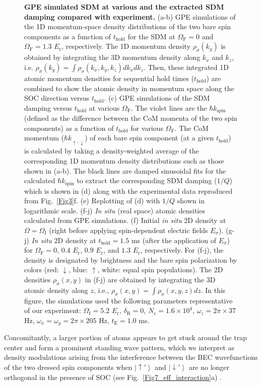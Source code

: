 \documentclass[showpacs,preprintnumbers,amsmath,amssymb, superscriptaddress, aps, reprint]{revtex4-1}
\def\E_r{E_{\text{r}}}
\def\deltaR{\delta_{\text{R}}}
\def\OmegaF{\Omega_{\text{F}}}
\def\OmegaI{\Omega_{\text{I}}}
\def\thold{t_{\text{hold}}}
\begin{document}
{\begin{figure}[ht]
\caption{{\textbf{GPE simulated SDM at various {\boldmath{$\OmegaF$}} and the extracted SDM damping compared with experiment.}} (a-b) GPE simulations of the 1D momentum-space density distributions of the two bare spin components as a function of $\thold$ for the SDM at $\OmegaF = 0$ and $\OmegaF = 1.3$ $\E_r$, respectively. The 1D momentum density ${\rho _\sigma }({k_y})$ is obtained by integrating the 3D momentum density along $k_x$ and $k_z$, i.e. ${\rho _\sigma }({k_y}) = \int {{\rho _\sigma }({k_x},{k_y},{k_z})d{k_x}d{k_z}}$. Then, these integrated 1D atomic momentum densities for sequential hold times ($\thold$) are combined to show the atomic density in momentum space along the SOC direction versus $\thold$. (c) GPE simulations of the SDM damping versus $\thold$ at various $\OmegaF$. The violet lines are the $\hbar k_{\text{spin}}$ (defined as the difference between the CoM momenta of the two spin components) as a function of $\thold$ for various $\OmegaF$. The CoM momentum ($\hbar k_{\uparrow, \downarrow}$) of each bare spin component (at a given $\thold$) is calculated by taking a density-weighted average of the corresponding 1D momentum density distributions such as those shown in (a-b). The black lines are damped sinusoidal fits for the calculated $\hbar k_{\text{spin}}$ to extract the corresponding SDM damping ($1/Q$) which is shown in (d) along with the experimental data reproduced from Fig.~\ref{Fig3}f. (e) Replotting of (d) with $1/Q$ shown in logarithmic scale. (f-j) \textit{In situ} (real space) atomic densities calculated from GPE simulations. (f) Initial \textit{in situ} 2D density at $\Omega = \OmegaI$ (right before applying spin-dependent electric fields $E_\sigma$). (g-j) \textit{In situ} 2D density at $\thold = 1.5$ ms (after the application of $E_\sigma$) for $\OmegaF = 0$, $0.4$ $\E_r$, $0.9$ $\E_r$, and $1.3$ $\E_r$, respectively. For (f-j), the density is designated by brightness and the bare spin polarization by colors (red: $\downarrow$, blue: $\uparrow$, white: equal spin populations). The 2D densities ${\rho _\sigma }({x, y})$ in (f-j) are obtained by integrating the 3D atomic density along $z$, i.e., ${\rho _\sigma }({x, y}) = \int {{\rho _\sigma }({x},{y},{z})d{z}}$. In this figure, the simulations used the following parameters representative of our experiment: $\OmegaI = 5.2$ $\E_r$, ${\deltaR} = 0$, ${N_{\text{c}}} = 1.6 \times {10^4}$, ${\omega _z} = 2\pi\times 37$ Hz, ${\omega _x} = {\omega _y} = 2\pi  \times 205$ Hz, $t_{\text{E}} = 1.0$ ms.}
\label{Fig5}
\end{figure}
Concomitantly, a larger portion of atoms appears to get stuck around the trap center and form a prominent standing wave pattern, which we interpret as density modulations arising from the interference between the BEC wavefunctions of the two dressed spin components when $\left| { \uparrow '} \right\rangle$ and $\left| { \downarrow '} \right\rangle$ are no longer orthogonal in the presence of SOC ({see Fig.~{\ref{Fig7_eff_interaction}}a}) \cite{Lin_SOC_Nature_2011,Zhai_SOC_2010,Ho_PhysRevLett2011,Stringari_SOC_PRL2012,ketterle_supersolid_2017}. 
}
\end{document}
